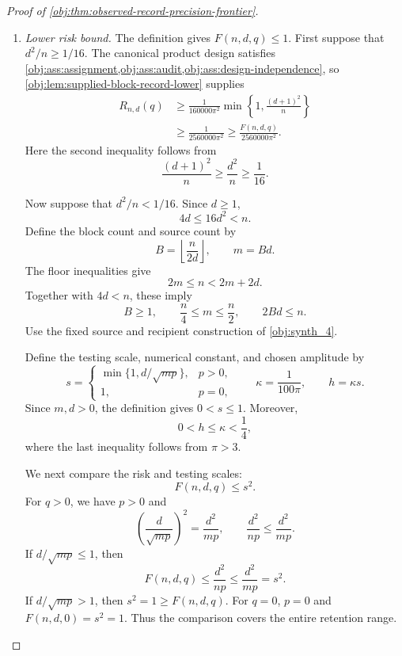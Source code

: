 \begin{proof}[Proof of \cref{obj:thm:observed-record-precision-frontier}]
\begin{enumerate}
\item \textit{Lower risk bound.}
The definition gives \(F(n,d,q)\le1\). First suppose that
\(d^2/n\ge1/16\). The canonical product design satisfies
\cref{obj:ass:assignment,obj:ass:audit,obj:ass:design-independence}, so
\cref{obj:lem:supplied-block-record-lower} supplies
\[
\begin{aligned}
R_{n,d}(q)
&\ge\frac{1}{160000\pi^2}
       \min\left\{1,\frac{(d+1)^2}{n}\right\}\\
&\ge\frac{1}{2560000\pi^2}
\ge\frac{F(n,d,q)}{2560000\pi^2}.
\end{aligned}
\]
Here the second inequality follows from
\[
\frac{(d+1)^2}{n}\ge\frac{d^2}{n}\ge\frac1{16}.
\]

Now suppose that \(d^2/n<1/16\). Since \(d\ge1\),
\[
4d\le16d^2<n.
\]
Define the block count and source count by
\[
B=\left\lfloor\frac{n}{2d}\right\rfloor,
\qquad
m=Bd.
\]
The floor inequalities give
\[
2m\le n<2m+2d.
\]
Together with \(4d<n\), these imply
\[
B\ge1,
\qquad
\frac n4\le m\le\frac n2,
\qquad
2Bd\le n.
\]
Use the fixed source and recipient construction of \cref{obj:synth_4}.

Define the testing scale, numerical constant, and chosen amplitude by
\[
s=
\begin{cases}
\min\{1,d/\sqrt{mp}\},&p>0,\\
1,&p=0,
\end{cases}
\qquad
\kappa=\frac1{100\pi},
\qquad
h=\kappa s.
\]
Since \(m,d>0\), the definition gives \(0<s\le1\). Moreover,
\[
0<h\le\kappa<\frac14,
\]
where the last inequality follows from \(\pi>3\).

We next compare the risk and testing scales:
\[
F(n,d,q)\le s^2.
\]
For \(q>0\), we have \(p>0\) and
\[
\left(\frac d{\sqrt{mp}}\right)^2=\frac{d^2}{mp},
\qquad
\frac{d^2}{np}\le\frac{d^2}{mp}.
\]
If \(d/\sqrt{mp}\le1\), then
\[
F(n,d,q)\le\frac{d^2}{np}\le\frac{d^2}{mp}=s^2.
\]
If \(d/\sqrt{mp}>1\), then \(s^2=1\ge F(n,d,q)\).
For \(q=0\), \(p=0\) and \(F(n,d,0)=s^2=1\).
Thus the comparison covers the entire retention range.


\end{enumerate}
\end{proof}
